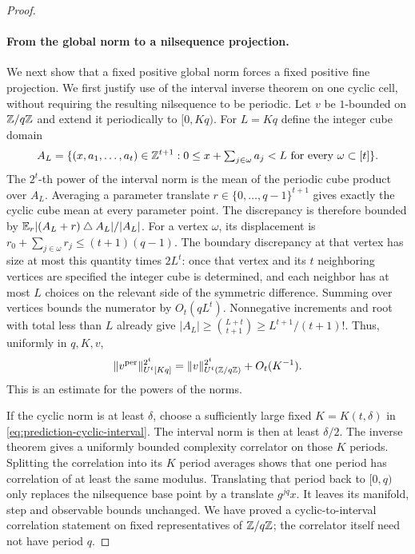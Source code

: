 \begin{proof}
\paragraph{From the global norm to a nilsequence projection.}
We next show that a fixed positive global norm forces a fixed
positive fine projection.  We first justify use of the interval
inverse theorem on one cyclic cell, without requiring the resulting
nilsequence to be periodic.  Let $v$ be $1$-bounded on $\mathbb Z/q\mathbb Z$ and
extend it periodically to $[0,Kq)$.  For $L=Kq$ define the integer
cube domain
\[
 A_L=\{(x,a_1,\ldots,a_t)\in\mathbb Z^{t+1}:
               0\leq x+\textstyle\sum_{j\in\omega}a_j<L
               \text{ for every }\omega\subset[t]\}.
\]
The $2^t$-th power of the interval norm is the mean of the periodic
cube product over $A_L$.  Averaging a parameter translate
$r\in\{0,\ldots,q-1\}^{t+1}$ gives exactly the cyclic cube mean
at every parameter point.  The discrepancy is therefore bounded
by $\mathbb E_r|(A_L+r)\mathbin\triangle A_L|/|A_L|$.
For a vertex $\omega$, its displacement is
$r_0+\sum_{j\in\omega}r_j\leq(t+1)(q-1)$.
The boundary discrepancy at that vertex has size at most this
quantity times $2L^t$: once that vertex and its $t$ neighboring
vertices are specified the integer cube is determined, and each
neighbor has at most $L$ choices on the relevant side of the
symmetric difference.  Summing over vertices bounds the numerator
by $O_t(qL^t)$.  Nonnegative increments and root with total less
than $L$ already give
$|A_L|\geq\binom{L+t}{t+1}\geq L^{t+1}/(t+1)!$.
Thus, uniformly in $q,K,v$,
\begin{equation}\label{eq:prediction-cyclic-interval}
 \|v^{\mathrm{per}}\|_{U^t[Kq]}^{2^t}
 =\|v\|_{U^t(\mathbb Z/q\mathbb Z)}^{2^t}+O_t(K^{-1}).
\end{equation}
This is an estimate for the powers of the norms.

If the cyclic norm is at least $\delta$, choose a sufficiently
large fixed $K=K(t,\delta)$ in
\eqref{eq:prediction-cyclic-interval}.  The interval norm is then
at least $\delta/2$.  The inverse theorem gives a uniformly bounded
complexity correlator on those $K$ periods.  Splitting the
correlation into its $K$ period averages shows that one period has
correlation of at least the same modulus.  Translating that period
back to $[0,q)$ only replaces the nilsequence base point by a
translate $g^{jq}x$.  It leaves its manifold, step and observable
bounds unchanged.  We have proved a cyclic-to-interval correlation
statement on fixed representatives of $\mathbb Z/q\mathbb Z$; the correlator
itself need not have period $q$.


\end{proof}
